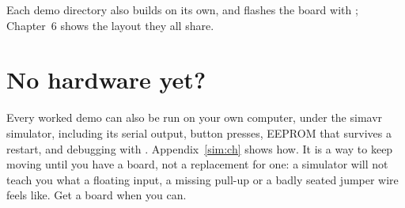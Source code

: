 \noindent Each demo directory also builds on its own, and flashes the board with ;
Chapter~6 shows the layout they all share.

\section*{No hardware yet?}
Every worked demo can also be run on your own computer, under the simavr simulator, including its
serial output, button presses, EEPROM that survives a restart, and debugging with .
Appendix~\ref{sim:ch} shows how. It is a way to keep moving until you have a board, not a
replacement for one: a simulator will not teach you what a floating input, a missing pull-up or a
badly seated jumper wire feels like. Get a board when you can.
